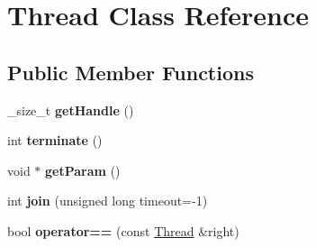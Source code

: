 \hypertarget{class_thread}{}\section{Thread Class Reference}
\label{class_thread}
\subsection*{Public Member Functions}
\begin{DoxyCompactItemize}
\item 
\+\_\+size\+\_\+t {\bfseries get\+Handle} ()\hypertarget{class_thread_ae7006a5a8cf4d92a2f0455cd917f0cf6}{}\label{class_thread_ae7006a5a8cf4d92a2f0455cd917f0cf6}

\item 
int {\bfseries terminate} ()\hypertarget{class_thread_a0e5d53525e16e8c818cafce4569c2376}{}\label{class_thread_a0e5d53525e16e8c818cafce4569c2376}

\item 
void $\ast$ {\bfseries get\+Param} ()\hypertarget{class_thread_af203c85710ab9a858cb40b86d7bd0790}{}\label{class_thread_af203c85710ab9a858cb40b86d7bd0790}

\item 
int {\bfseries join} (unsigned long timeout=-\/1)\hypertarget{class_thread_a38398ecb1d536940202fa1cfee8fc0c4}{}\label{class_thread_a38398ecb1d536940202fa1cfee8fc0c4}

\item 
bool {\bfseries operator==} (const \hyperlink{class_thread}{Thread} \&right)\hypertarget{class_thread_a4d789890939e927d0440581ae2107913}{}\label{class_thread_a4d789890939e927d0440581ae2107913}

\end{DoxyCompactItemize}
